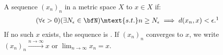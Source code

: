     \begin{definition}
        A sequence $(x_n)_n$ in a metric space $X$  to $x \in X$ if:
            \begin{equation*}
            \begin{split}
                (\forall \epsilon > 0)(\exists N_\epsilon \in \bfN) \mtext{s.t.} n \geq N_\epsilon \implies d(x_n,x) < \epsilon.\footnotemark
            \end{split}
            \end{equation*}
        If no such $x$ exists, the sequence is . If $(x_n)_n$ converges to $x$, we write $(x_n)_n \xrightarrow{n \rightarrow \infty} x$ or $\lim_{n \rightarrow \infty}x_n = x$.
    \end{definition}

